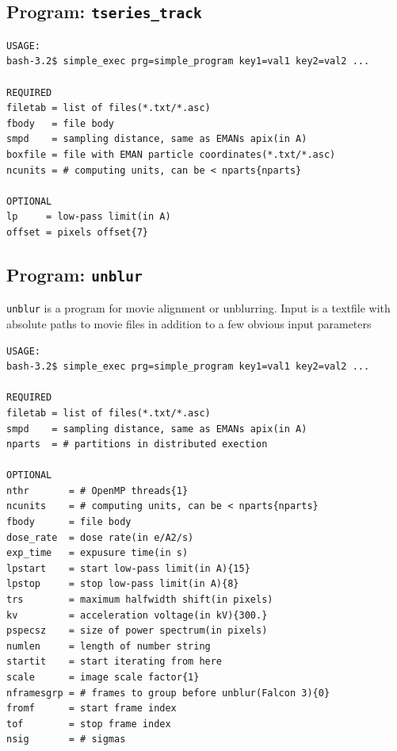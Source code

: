 \documentclass[a4paper,11pt]{article}
\newcommand{\prgname}[1]{\textcolor{NavyBlue}{\texttt{#1}}}
\begin{document}
\subsection{Program: \prgname{tseries\_track}}
\label{tseries_track}
\begin{verbatim}
USAGE:
bash-3.2$ simple_exec prg=simple_program key1=val1 key2=val2 ...

REQUIRED
filetab = list of files(*.txt/*.asc)
fbody   = file body
smpd    = sampling distance, same as EMANs apix(in A)
boxfile = file with EMAN particle coordinates(*.txt/*.asc)
ncunits = # computing units, can be < nparts{nparts}

OPTIONAL
lp     = low-pass limit(in A)
offset = pixels offset{7}
\end{verbatim}

\subsection{Program: \prgname{unblur}}
\label{unblur}
\prgname{unblur} is a program for movie alignment or unblurring. Input is a textfile with absolute paths to movie files in addition to a few obvious input parameters

\begin{verbatim}
USAGE:
bash-3.2$ simple_exec prg=simple_program key1=val1 key2=val2 ...

REQUIRED
filetab = list of files(*.txt/*.asc)
smpd    = sampling distance, same as EMANs apix(in A)
nparts  = # partitions in distributed exection

OPTIONAL
nthr       = # OpenMP threads{1}
ncunits    = # computing units, can be < nparts{nparts}
fbody      = file body
dose_rate  = dose rate(in e/A2/s)
exp_time   = expusure time(in s)
lpstart    = start low-pass limit(in A){15}
lpstop     = stop low-pass limit(in A){8}
trs        = maximum halfwidth shift(in pixels)
kv         = acceleration voltage(in kV){300.}
pspecsz    = size of power spectrum(in pixels)
numlen     = length of number string
startit    = start iterating from here
scale      = image scale factor{1}
nframesgrp = # frames to group before unblur(Falcon 3){0}
fromf      = start frame index
tof        = stop frame index
nsig       = # sigmas
\end{verbatim}
\end{document}
